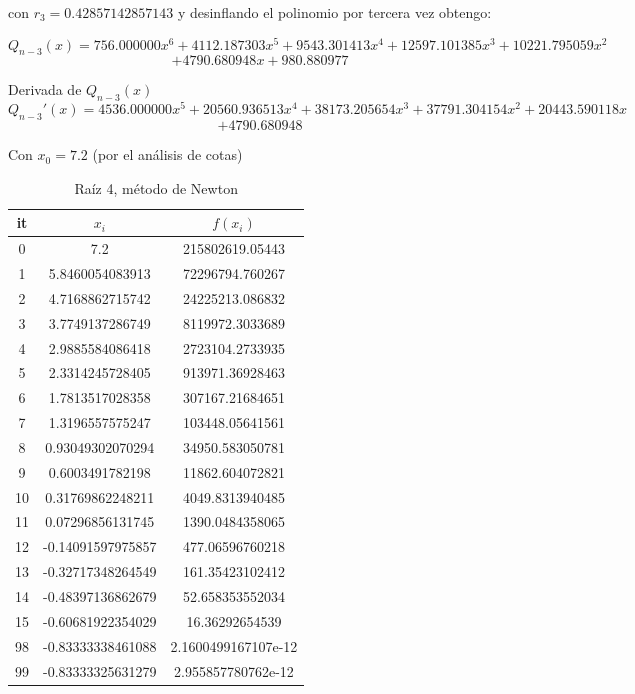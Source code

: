 \documentclass{article} %
\begin{document}
con $r_3 = 0.42857142857143$ y desinflando el polinomio por tercera vez obtengo:

\begin{equation*}
    Q_{n-3}(x) = 756.000000x^6 + 4112.187303x^5 + 9543.301413x^4 + 12597.101385x^3 + 10221.795059x^2
\end{equation*}
\begin{equation*}
     + 4790.680948x + 980.880977
\end{equation*}

Derivada de $Q_{n-3}(x)$
\begin{equation*}
  Q_{n-3}'(x) = 4536.000000x^5 + 20560.936513x^4 + 38173.205654x^3 + 37791.304154x^2 + 20443.590118x
\end{equation*}
\begin{equation*}
     + 4790.680948
\end{equation*}

Con $x_0 = 7.2$ (por el análisis de cotas) 
\begin{table}[H]
\centering
\begin{tabular}{|c|c|c|}
\hline
it & $x_i$ & $f(x_i)$\\
\hline
0 & 7.2 & 215802619.05443\\
1 & 5.8460054083913 & 72296794.760267\\
2 & 4.7168862715742 & 24225213.086832\\
3 & 3.7749137286749 & 8119972.3033689\\
4 & 2.9885584086418 & 2723104.2733935\\
5 & 2.3314245728405 & 913971.36928463\\
6 & 1.7813517028358 & 307167.21684651\\
7 & 1.3196557575247 & 103448.05641561\\
8 & 0.93049302070294 & 34950.583050781\\
9 & 0.6003491782198 & 11862.604072821\\
10 & 0.31769862248211 & 4049.8313940485\\
11 & 0.07296856131745 & 1390.0484358065\\
12 & -0.14091597975857 & 477.06596760218\\
13 & -0.32717348264549 & 161.35423102412\\
14 & -0.48397136862679 & 52.658353552034\\
15 & -0.60681922354029 & 16.36292654539\\
98 & -0.83333338461088 & 2.1600499167107e-12\\
99 & -0.83333325631279 & 2.955857780762e-12\\
\hline
\end{tabular}
\caption{Raíz 4, método de Newton}
\end{table}
\end{document}
